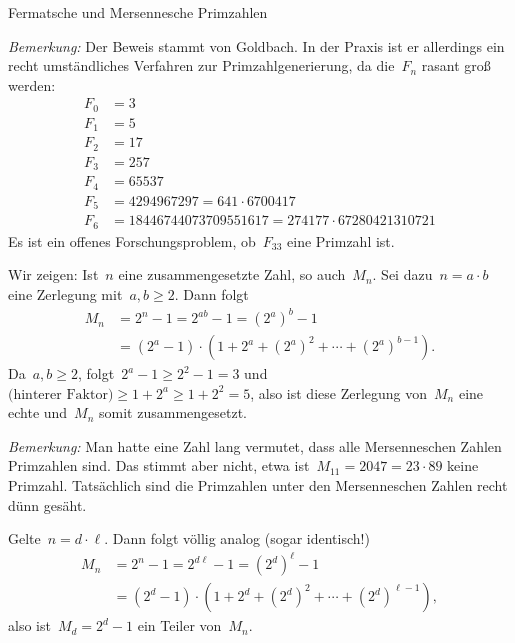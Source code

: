 \documentclass{algblatt}
\begin{document}
\begin{aufgabe}{Fermatsche und Mersennesche Primzahlen}
\begin{loesungE}
\emph{Bemerkung:} Der Beweis stammt von Goldbach. In der Praxis ist er
allerdings ein recht umständliches Verfahren zur Primzahlgenerierung, da
die~$F_n$ rasant groß werden:
\begin{align*}
  F_0 &= 3 \\
  F_1 &= 5 \\
  F_2 &= 17 \\
  F_3 &= 257 \\
  F_4 &= 65537 \\
  F_5 &= 4294967297 = 641 \cdot 6700417 \\
  F_6 &= 18446744073709551617 = 274177 \cdot 67280421310721
\end{align*}
Es ist ein offenes Forschungsproblem, ob~$F_{33}$ eine Primzahl ist.

\item Wir zeigen: Ist~$n$ eine zusammengesetzte Zahl, so auch~$M_n$. Sei
dazu~$n = a \cdot b$ eine Zerlegung mit~$a,b \geq 2$. Dann folgt
\begin{align*}
  M_n &= 2^n - 1 = 2^{ab} - 1 = (2^a)^b - 1 \\
  &= (2^a - 1) \cdot (1 + 2^a + (2^a)^2 + \cdots + (2^a)^{b-1}).
\end{align*}
Da~$a,b \geq 2$, folgt~$2^a - 1 \geq 2^2 - 1 = 3$ und~$\text{(hinterer Faktor)}
\geq 1 + 2^a \geq 1 + 2^2 = 5$, also ist diese Zerlegung von~$M_n$ eine echte
und~$M_n$ somit zusammengesetzt.

\emph{Bemerkung:} Man hatte eine Zahl lang vermutet, dass alle Mersenneschen Zahlen
Primzahlen sind. Das stimmt aber nicht, etwa ist~$M_{11} = 2047 = 23 \cdot 89$
keine Primzahl. Tatsächlich sind die Primzahlen unter den Mersenneschen Zahlen
recht dünn gesäht.

\item Gelte~$n = d \cdot \ell$. Dann folgt völlig analog (sogar identisch!)
\begin{align*}
  M_n &= 2^n - 1 = 2^{d\ell} - 1 = (2^d)^\ell - 1 \\
  &= (2^d - 1) \cdot (1 + 2^d + (2^d)^2 + \cdots + (2^d)^{\ell-1}),
\end{align*}
also ist~$M_d = 2^d - 1$ ein Teiler von~$M_n$.
\end{loesungE}
\end{aufgabe}
\end{document}
